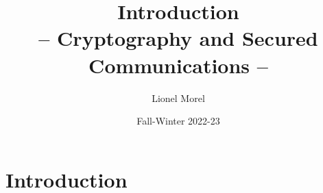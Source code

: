 \documentclass[
hyperref={pdfpagelabels=false}
,xcolor=table
]
{beamer}
\title[CSC - Intro]{Introduction \\ -- Cryptography and Secured Communications --}
\author[]{Lionel Morel}
\institute[]{Telecommunications - INSA Lyon}
\date{Fall-Winter 2022-23}
\begin{document}
\begin{frame}
  \maketitle
\end{frame}





\section{Introduction}
\end{document}
